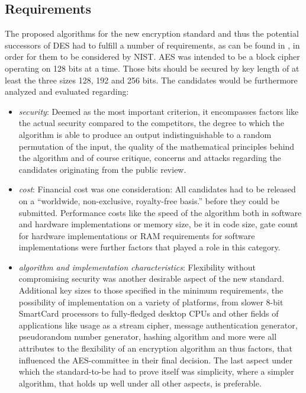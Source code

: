 \subsection{Requirements}
\label{ch:requirements}

The proposed algorithms for the new encryption standard and thus the
potential successors of DES had to fulfill a number of requirements, as can be found in \cite{announcementrequest}, in order for them to be considered by \ac{NIST}. \ac{AES} was intended to be a block cipher operating on 128 bits at a time. Those bits should be secured by
key length of at least the three sizes 128, 192 and 256 bits.
The candidates would be furthermore analyzed and evaluated regarding:

\begin{itemize}
\item
  \emph{security}: Deemed as the most important criterion, it
  encompasses factors like the actual security compared to the
  competitors, the degree to which the algorithm is able to produce an
  output indistinguishable to a random permutation of the input, the
  quality of the mathematical principles behind the algorithm and of
  course critique, concerns and attacks regarding the candidates
  originating from the public review.
\item
  \emph{cost}: Financial cost was one consideration: All candidates had
  to be released on a ``worldwide, non-exclusive, royalty-free basis.''
  before they could be submitted. Performance costs like the speed of
  the algorithm both in software and hardware implementations or memory
  size, be it in code size, gate count for hardware implementations or
  RAM requirements for software implementations were further factors
  that played a role in this category.
\item
  \emph{algorithm and implementation characteristics}: Flexibility
  without compromising security was another desirable aspect of the new
  standard. Additional key sizes to those specified in the minimum
  requirements, the possibility of implementation on a variety of
  platforms, from slower 8-bit SmartCard processors to fully-fledged
  desktop CPUs and other fields of applications like usage as a stream
  cipher, message authentication generator, pseudorandom number
  generator, hashing algorithm and more were all attributes to the
  flexibility of an encryption algorithm an thus factors, that
  influenced the \ac{AES}-committee in their final decision. The last aspect
  under which the standard-to-be had to prove itself was simplicity,
  where a simpler algorithm, that holds up well under all other aspects,
  is preferable.
\end{itemize}


